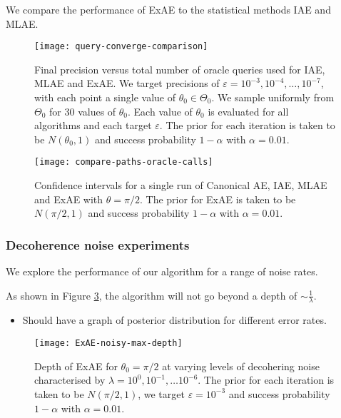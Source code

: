 We compare the performance of ExAE to the statistical methods IAE and MLAE. 

\begin{figure}[htb]
	\centering
	\texttt{[image: query-converge-comparison]}
	\caption{Final precision versus total number of oracle queries used for IAE, MLAE and ExAE. We target precisions of $\varepsilon = 10^{-3}, 10^{-4}, \ldots , 10^{-7}$, with each point a single value of $\theta_0 \in \Theta_0$. We sample uniformly from $\Theta_0$ for 30 values of $\theta_0$. Each value of $\theta_0$ is evaluated for all algorithms and each target $\varepsilon$. The prior for each iteration is taken to be $N(\theta_0, 1)$ and success probability $1 - \alpha$ with $\alpha = 0.01$.}
	\label{fig::query-comparison-noiseless}
\end{figure}


\begin{figure}[htb]
	\centering
	\texttt{[image: compare-paths-oracle-calls]}
	\caption{Confidence intervals for a single run of Canonical AE, IAE, MLAE and ExAE with $\theta = \pi / 2$. The prior for ExAE is taken to be $N(\pi/2, 1)$ and success probability $1 - \alpha$ with $\alpha = 0.01$.}
	\label{fig::compare-paths-oracle-calls}
\end{figure}

\subsubsection{Decoherence noise experiments}

We explore the performance of our algorithm for a range of noise rates.

As shown in Figure \ref{fig::ExAE-noisy-max-depth}, the algorithm will not go beyond a depth of $\sim \frac{1}{\lambda}$. 

\begin{itemize}
	\color{red}
	\item Should have a graph of posterior distribution for different error rates. 
\end{itemize}

\begin{figure}[htb]
	\centering
	\texttt{[image: ExAE-noisy-max-depth]}
	\caption{Depth of ExAE for $\theta_0 = \pi / 2$ at varying levels of decohering noise characterised by $\lambda = 10^0, 10^{-1}, \ldots 10^{-6}$. The prior for each iteration is taken to be $N(\pi /2, 1)$, we target $\varepsilon = 10^{-3}$ and success probability $1 - \alpha$ with $\alpha = 0.01$.}
	\label{fig::ExAE-noisy-max-depth}
\end{figure}

